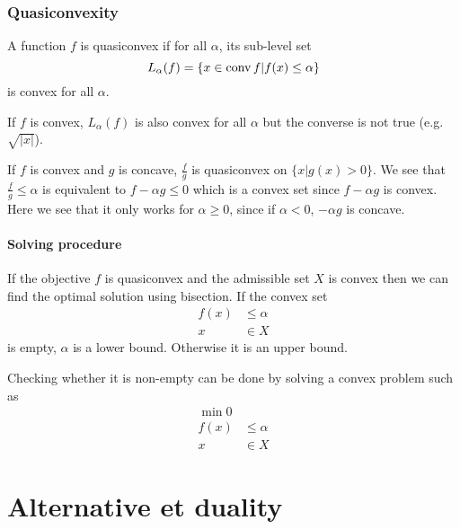 \subsubsection{Quasiconvexity}
\begin{mydef}[Quasiconvex]
  A function $f$ is quasiconvex if for all $\alpha$,
  its sub-level set
  \[ L_\alpha(f) = \{x \in \operatorname{conv} f | f(x) \leq \alpha\} \]
  is convex for all $\alpha$.
\end{mydef}

If $f$ is convex, $L_\alpha(f)$ is also convex for all $\alpha$
but the converse is not true (e.g. $\sqrt{|x|}$).

If $f$ is convex and $g$ is concave, $\frac{f}{g}$ is quasiconvex on $\{x | g(x) > 0\}$.
We see that $\frac{f}{g} \leq \alpha$ is equivalent to
$f - \alpha g \leq 0$ which is a convex set since $f - \alpha g$ is convex.
Here we see that it only works for $\alpha \geq 0$, since if $\alpha < 0$, $-\alpha g$ is concave.

\paragraph{Solving procedure}
If the objective $f$ is quasiconvex and the admissible set $X$ is convex then
we can find the optimal solution using bisection.
If the convex set
\begin{align*}
  f(x) & \leq \alpha\\
  x & \in X
\end{align*}
is empty, $\alpha$ is a lower bound.
Otherwise it is an upper bound.

Checking whether it is non-empty can be done by solving a convex problem
such as
\begin{align*}
  \min 0\\
  f(x) & \leq \alpha\\
  x & \in X
\end{align*}


\section{Alternative et duality}
